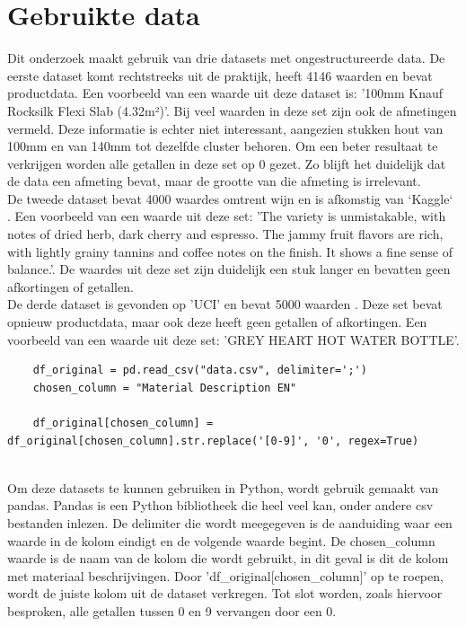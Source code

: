 \section{Gebruikte data}
Dit onderzoek maakt gebruik van drie datasets met ongestructureerde data. De eerste dataset komt rechtstreeks uit de praktijk, heeft 4146 waarden en bevat productdata. Een voorbeeld van een waarde uit deze dataset is: '100mm Knauf Rocksilk Flexi Slab (4.32m²)'. Bij veel waarden in deze set zijn ook de afmetingen vermeld. Deze informatie is echter niet interessant, aangezien stukken hout van 100mm en van 140mm tot dezelfde cluster behoren. Om een beter resultaat te verkrijgen worden alle getallen in deze set op 0 gezet. Zo blijft het duidelijk dat de data een afmeting bevat, maar de grootte van die afmeting is irrelevant.
\\\indent
De tweede dataset bevat 4000 waardes omtrent wijn en is afkomstig van `Kaggle` \autocite{Iv2018}. Een voorbeeld van een waarde uit deze set: 'The variety is unmistakable, with notes of dried herb, dark cherry and espresso. The jammy fruit flavors are rich, with lightly grainy tannins and coffee notes on the finish. It shows a fine sense of balance.'. De waardes uit deze set zijn duidelijk een stuk langer en bevatten geen afkortingen of getallen.
\\\indent
De derde dataset is gevonden op 'UCI' en bevat 5000 waarden \autocite{Chen2012}. Deze set bevat opnieuw productdata, maar ook deze heeft geen getallen of afkortingen. Een voorbeeld van een waarde uit deze set: 'GREY HEART HOT WATER BOTTLE'.
\\\indent
\begin{lstlisting}
    df_original = pd.read_csv("data.csv", delimiter=';')
    chosen_column = "Material Description EN"

    df_original[chosen_column] = df_original[chosen_column].str.replace('[0-9]', '0', regex=True)
\end{lstlisting}
\\\indent
Om deze datasets te kunnen gebruiken in Python, wordt gebruik gemaakt van pandas. Pandas is een Python bibliotheek die heel veel kan, onder andere csv bestanden inlezen. De delimiter die wordt meegegeven is de aanduiding waar een waarde in de kolom eindigt en de volgende waarde begint. De chosen\_column waarde is de naam van de kolom die wordt gebruikt, in dit geval is dit de kolom met materiaal beschrijvingen. Door 'df\_original[chosen\_column]' op te roepen, wordt de juiste kolom uit de dataset verkregen. Tot slot worden, zoals hiervoor besproken, alle getallen tussen 0 en 9 vervangen door een 0.



